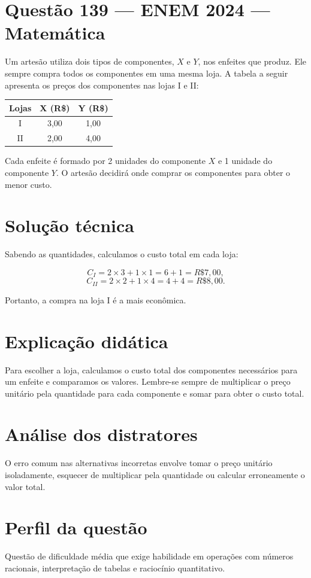 \documentclass{article}
\begin{document}
\section*{Questão 139 — ENEM 2024 — Matemática}

Um artesão utiliza dois tipos de componentes, \(X\) e \(Y\), nos enfeites que produz. Ele sempre compra todos os componentes em uma mesma loja. A tabela a seguir apresenta os preços dos componentes nas lojas I e II:

\begin{center}
\begin{tabular}{|c|c|c|}
\hline
\rowcolor[HTML]{F4CCCC} 
\textbf{Lojas} & \textbf{X (R\$)} & \textbf{Y (R\$)} \\
\hline
I & 3,00 & 1,00 \\
\hline
II & 2,00 & 4,00 \\
\hline
\end{tabular}
\end{center}

Cada enfeite é formado por 2 unidades do componente \(X\) e 1 unidade do componente \(Y\). O artesão decidirá onde comprar os componentes para obter o menor custo.

\section*{Solução técnica}

Sabendo as quantidades, calculamos o custo total em cada loja:

\[
C_{I} = 2 \times 3 + 1 \times 1 = 6 + 1 = R\$ 7,00,
\]
\[
C_{II} = 2 \times 2 + 1 \times 4 = 4 + 4 = R\$ 8,00.
\]

Portanto, a compra na loja I é a mais econômica.

\section*{Explicação didática}

Para escolher a loja, calculamos o custo total dos componentes necessários para um enfeite e comparamos os valores. Lembre-se sempre de multiplicar o preço unitário pela quantidade para cada componente e somar para obter o custo total.

\section*{Análise dos distratores}

O erro comum nas alternativas incorretas envolve tomar o preço unitário isoladamente, esquecer de multiplicar pela quantidade ou calcular erroneamente o valor total.

\section*{Perfil da questão}

Questão de dificuldade média que exige habilidade em operações com números racionais, interpretação de tabelas e raciocínio quantitativo.
\end{document}
